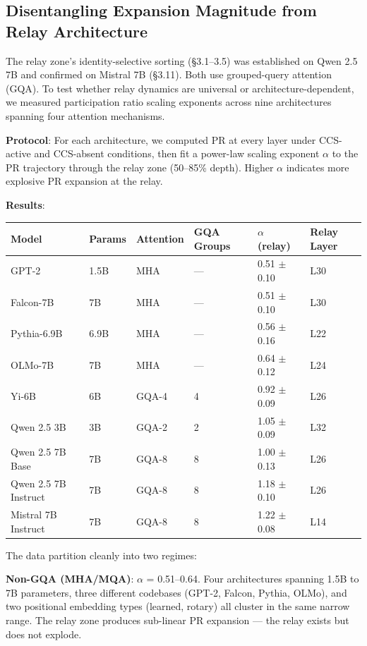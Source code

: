 \documentclass[11pt]{article}
\begin{document}
\subsection{Disentangling Expansion Magnitude from Relay Architecture}

The relay zone's identity-selective sorting (§3.1–3.5) was established on Qwen 2.5 7B and confirmed on Mistral 7B (§3.11). Both use grouped-query attention (GQA). To test whether relay dynamics are universal or architecture-dependent, we measured participation ratio scaling exponents across nine architectures spanning four attention mechanisms.

\textbf{Protocol}: For each architecture, we computed PR at every layer under CCS-active and CCS-absent conditions, then fit a power-law scaling exponent $\alpha$ to the PR trajectory through the relay zone (50–85\% depth). Higher $\alpha$ indicates more explosive PR expansion at the relay.

\textbf{Results}:

\begin{table}[h]
\centering
\small
\begin{tabular}{|l|l|l|l|l|l|}
\hline
\textbf{Model} & \textbf{Params} & \textbf{Attention} & \textbf{GQA Groups} & \textbf{$\alpha$ (relay)} & \textbf{Relay Layer} \\
\hline
GPT-2 & 1.5B & MHA & --- & 0.51 $\pm$ 0.10 & L30 \\
Falcon-7B & 7B & MHA & --- & 0.51 $\pm$ 0.10 & L30 \\
Pythia-6.9B & 6.9B & MHA & --- & 0.56 $\pm$ 0.16 & L22 \\
OLMo-7B & 7B & MHA & --- & 0.64 $\pm$ 0.12 & L24 \\
Yi-6B & 6B & GQA-4 & 4 & 0.92 $\pm$ 0.09 & L26 \\
Qwen 2.5 3B & 3B & GQA-2 & 2 & 1.05 $\pm$ 0.09 & L32 \\
Qwen 2.5 7B Base & 7B & GQA-8 & 8 & 1.00 $\pm$ 0.13 & L26 \\
Qwen 2.5 7B Instruct & 7B & GQA-8 & 8 & 1.18 $\pm$ 0.10 & L26 \\
Mistral 7B Instruct & 7B & GQA-8 & 8 & 1.22 $\pm$ 0.08 & L14 \\
\hline
\end{tabular}
\end{table}

The data partition cleanly into two regimes:

\textbf{Non-GQA (MHA/MQA)}: $\alpha$ = 0.51–0.64. Four architectures spanning 1.5B to 7B parameters, three different codebases (GPT-2, Falcon, Pythia, OLMo), and two positional embedding types (learned, rotary) all cluster in the same narrow range. The relay zone produces sub-linear PR expansion --- the relay exists but does not explode.
\end{document}
